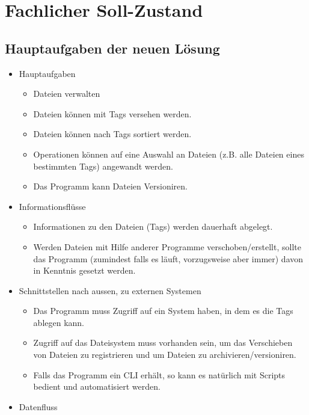 \documentclass[10pt,paper=a4,final]{scrartcl}
\begin{document}
\section{Fachlicher Soll-Zustand}
\subsection{Hauptaufgaben der neuen L\"osung}
\begin{itemize}
  \item Hauptaufgaben
    \begin{itemize}
      \item Dateien verwalten
      \item Dateien können mit Tags versehen werden.
      \item Dateien können nach Tags sortiert werden.
      \item Operationen können auf eine Auswahl an Dateien (z.B. alle Dateien eines bestimmten Tags) angewandt werden.
      \item Das Programm kann Dateien Versioniren.
    \end{itemize}
  \item Informationsflüsse
    \begin{itemize}
      \item Informationen zu den Dateien (Tags) werden dauerhaft abgelegt.
      \item Werden Dateien mit Hilfe anderer Programme verschoben/erstellt, sollte das Programm (zumindest falls es läuft, vorzugsweise aber immer) davon in Kenntnis gesetzt werden.
    \end{itemize}
  \item Schnittstellen nach aussen, zu externen Systemen
    \begin{itemize}
      \item Das Programm muss Zugriff auf ein System haben, in dem es die Tags ablegen kann.
      \item Zugriff auf das Dateisystem muss vorhanden sein, um das Verschieben von Dateien zu registrieren und um Dateien zu archivieren/versioniren.
      \item Falls das Programm ein CLI erhält, so kann es natürlich mit Scripts bedient und automatisiert werden.
    \end{itemize}
  \item Datenfluss
  \begin{figure}[h!]

\end{figure}
\end{itemize}
\end{document}
